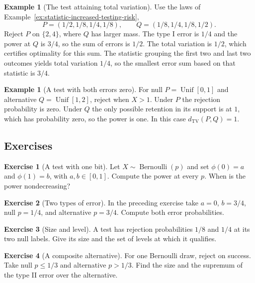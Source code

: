 \documentclass[11pt,oneside]{book}
\theoremstyle{definition}
\newtheorem{example}[theorem]{Example}
\newtheorem{exercise}{Exercise}[section]
\theoremstyle{remark}
\begin{document}
\begin{example}[The test attaining total variation]
\label{ex:test-tv-four-outcomes}
Use the laws of Example~\ref{ex:statistic-increased-testing-risk},
\[
P=(1/2,1/8,1/4,1/8),\qquad Q=(1/8,1/4,1/8,1/2).
\]
Reject $P$ on $\{2,4\}$, where $Q$ has larger mass. The type I
error is $1/4$ and the power at $Q$ is $3/4$, so the sum of
errors is $1/2$. The total variation is $1/2$, which certifies
optimality for this sum. The statistic grouping the first two
and last two outcomes yields total variation $1/4$, so the
smallest error sum based on that statistic is $3/4$.
\end{example}

\begin{example}[A test with both errors zero]
\label{ex:test-disjoint-support}
For null $P=\operatorname{Unif}[0,1]$ and alternative
$Q=\operatorname{Unif}[1,2]$, reject when $X>1$. Under $P$ the
rejection probability is zero. Under $Q$ the only possible
retention in its support is at $1$, which has probability zero,
so the power is one. In this case $d_{\mathrm{TV}}(P,Q)=1$.
\end{example}

\subsection{Exercises}
\label{subsec:exercises-6-1}

\begin{exercise}[A test with one bit]
\label{exer:test-one-bit-power}
Let $X\sim\operatorname{Bernoulli}(p)$ and set $\phi(0)=a$ and
$\phi(1)=b$, with $a,b\in[0,1]$. Compute the power at every $p$.
When is the power nondecreasing?
\end{exercise}

\begin{exercise}[Two types of error]
\label{exer:test-two-error-probabilities}
In the preceding exercise take $a=0$, $b=3/4$, null $p=1/4$,
and alternative $p=3/4$. Compute both error probabilities.
\end{exercise}

\begin{exercise}[Size and level]
\label{exer:test-size-versus-level}
A test has rejection probabilities $1/8$ and $1/4$ at its two null
labels. Give its size and the set of levels at which it qualifies.
\end{exercise}

\begin{exercise}[A composite alternative]
\label{exer:test-composite-alternative-power}
For one Bernoulli draw, reject on success. Take null $p\leq1/3$
and alternative $p>1/3$. Find the size and the supremum of the
type II error over the alternative.
\end{exercise}
\end{document}
